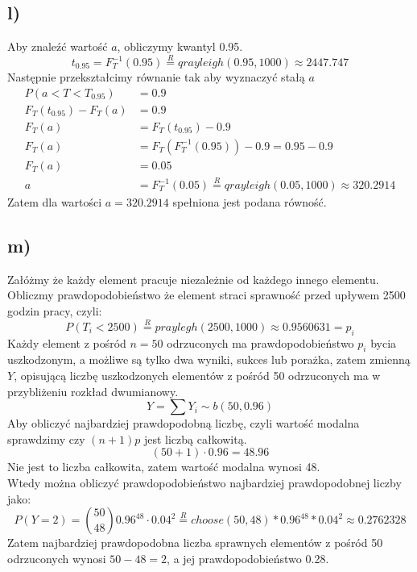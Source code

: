 \documentclass{article}
\begin{document}
\subsection{l)}
Aby znaleźć wartość $a$, obliczymy kwantyl 0.95.
\[ t_{0.95} = F_T^{-1}(0.95) \overset{R}{=} qrayleigh(0.95, 1000) \approx 2447.747 \]
Następnie przekształcimy równanie tak aby wyznaczyć stałą $a$
\begin{align*}
P(a < T < T_{0.95}) & = 0.9 \\
F_T(t_{0.95}) - F_T(a) & = 0.9 \\
F_T(a) & = F_T(t_{0.95}) - 0.9 \\
F_T(a) & = F_T(F_T^{-1}(0.95)) - 0.9 = 0.95 - 0.9 \\
F_T(a) & = 0.05 \\
a & = F^{-1}_T(0.05) \overset{R}{=} qrayleigh(0.05, 1000) \approx 320.2914
\end{align*}
Zatem dla wartości $a = 320.2914$ spełniona jest podana równość.

\subsection{m)}
Załóżmy że każdy element pracuje niezależnie od każdego innego elementu. Obliczmy prawdopodobieństwo że element straci sprawność przed upływem 2500 godzin pracy, czyli:
\[ P(T_i < 2500) \overset{R}{=} praylegh(2500, 1000) \approx 0.9560631 = p_i \]
Każdy element z pośród $n = 50$ odrzuconych ma prawdopodobieństwo $p_i$ bycia uszkodzonym, a możliwe są tylko dwa wyniki, sukces lub porażka, zatem zmienną $Y$, opisującą liczbę uszkodzonych elementów z pośród 50 odrzuconych ma w przybliżeniu rozkład dwumianowy.
\[ Y = \sum Y_i \sim b(50,0.96) \]
Aby obliczyć najbardziej prawdopodobną liczbę, czyli wartość modalna sprawdzimy czy $(n+1)p$ jest liczbą całkowitą.
\[ (50 + 1) \cdot 0.96 = 48.96 \]
Nie jest to liczba całkowita, zatem wartość modalna wynosi 48. \\
Wtedy można obliczyć prawdopodobieństwo najbardziej prawdopodobnej liczby jako:
\[ P(Y = 2) = \binom{50}{48} 0.96^{48} \cdot 0.04^2 \overset{R}{=} choose(50,48)*0.96^48*0.04^2 \approx 0.2762328 \]
Zatem najbardziej prawdopodobna liczba sprawnych elementów z pośród 50 odrzuconych wynosi $50 - 48 = 2$, a jej prawdopodobieństwo 0.28.
\end{document}
